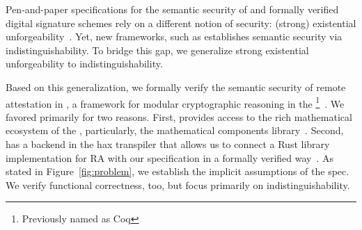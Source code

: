 
%
Pen-and-paper specifications for the semantic security of \ra
and formally verified digital signature schemes rely
on a different notion of security: (strong) existential unforgeability~\cite{vrased,dupressoir2021machine}.
%
Yet, new frameworks, such as \ssprove establishes semantic
security via indistinguishability.
%
To bridge this gap, we generalize strong existential unforgeability to
indistinguishability.
%


%
Based on this generalization, we formally verify the semantic security
of remote attestation in \ssprove, a framework for modular cryptographic
reasoning in the \coq\footnote{Previously named as Coq}~\cite{coq1996}.
%
We favored \ssprove primarily for two reasons.
%
First, \ssprove provides access to the rich mathematical ecosystem of the \coq, particularly, the mathematical components library~\cite{mahboubi2021mathematical}.
%
Second, \ssprove has a backend in the hax transpiler that allows
us to connect a Rust library implementation for RA with our specification
in a formally verified way~\cite{10.1145/3636501.3636961}.
%
As stated in Figure~\ref{fig:problem}, we establish the implicit assumptions
of the \tpm spec.
%
We verify functional correctness, too, but focus primarily on
indistinguishability.
%


